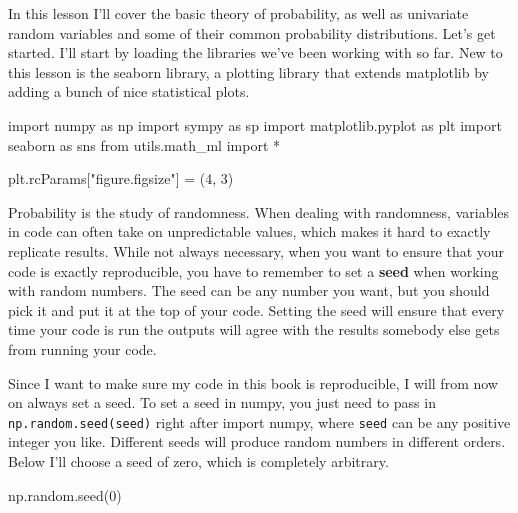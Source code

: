 \documentclass[
  letterpaper,
  DIV=11,
  numbers=noendperiod]{scrreprt}
\newenvironment{Shaded}{\begin{snugshade}}{\end{snugshade}}
\newcommand{\DecValTok}[1]{\textcolor[rgb]{0.68,0.00,0.00}{#1}}
\newcommand{\ImportTok}[1]{\textcolor[rgb]{0.00,0.46,0.62}{#1}}
\newcommand{\NormalTok}[1]{\textcolor[rgb]{0.00,0.23,0.31}{#1}}
\newcommand{\OperatorTok}[1]{\textcolor[rgb]{0.37,0.37,0.37}{#1}}
\newcommand{\StringTok}[1]{\textcolor[rgb]{0.13,0.47,0.30}{#1}}
\begin{document}
In this lesson I'll cover the basic theory of probability, as well as
univariate random variables and some of their common probability
distributions. Let's get started. I'll start by loading the libraries
we've been working with so far. New to this lesson is the seaborn
library, a plotting library that extends matplotlib by adding a bunch of
nice statistical plots.

\begin{Shaded}
\begin{Highlighting}[]
\ImportTok{import}\NormalTok{ numpy }\ImportTok{as}\NormalTok{ np}
\ImportTok{import}\NormalTok{ sympy }\ImportTok{as}\NormalTok{ sp}
\ImportTok{import}\NormalTok{ matplotlib.pyplot }\ImportTok{as}\NormalTok{ plt}
\ImportTok{import}\NormalTok{ seaborn }\ImportTok{as}\NormalTok{ sns}
\ImportTok{from}\NormalTok{ utils.math\_ml }\ImportTok{import} \OperatorTok{*}

\NormalTok{plt.rcParams[}\StringTok{"figure.figsize"}\NormalTok{] }\OperatorTok{=}\NormalTok{ (}\DecValTok{4}\NormalTok{, }\DecValTok{3}\NormalTok{)}
\end{Highlighting}
\end{Shaded}

Probability is the study of randomness. When dealing with randomness,
variables in code can often take on unpredictable values, which makes it
hard to exactly replicate results. While not always necessary, when you
want to ensure that your code is exactly reproducible, you have to
remember to set a \textbf{seed} when working with random numbers. The
seed can be any number you want, but you should pick it and put it at
the top of your code. Setting the seed will ensure that every time your
code is run the outputs will agree with the results somebody else gets
from running your code.

Since I want to make sure my code in this book is reproducible, I will
from now on always set a seed. To set a seed in numpy, you just need to
pass in \texttt{np.random.seed(seed)} right after import numpy, where
\texttt{seed} can be any positive integer you like. Different seeds will
produce random numbers in different orders. Below I'll choose a seed of
zero, which is completely arbitrary.

\begin{Shaded}
\begin{Highlighting}[]
\NormalTok{np.random.seed(}\DecValTok{0}\NormalTok{)}
\end{Highlighting}
\end{Shaded}
\end{document}
